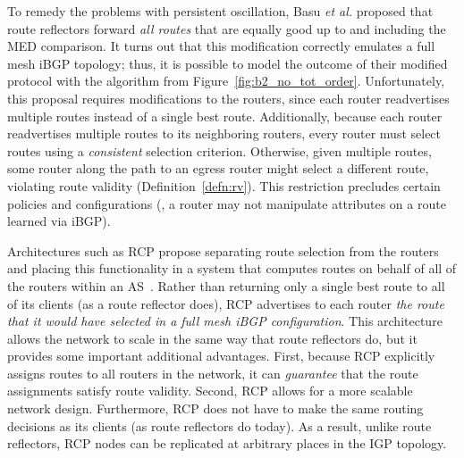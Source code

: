 To remedy the problems with persistent oscillation, Basu {\em et al.}
proposed that route reflectors forward {\em all routes} that are equally
good up to and including the MED comparison.  It turns out that this
modification correctly emulates a full mesh iBGP topology; thus, it is
possible to model the outcome of their modified protocol with the
algorithm from Figure~\ref{fig:b2_no_tot_order}.  
Unfortunately,
this proposal
requires modifications to the routers, since each router readvertises
multiple routes instead of a single best route.  Additionally, because
each router readvertises multiple routes to its neighboring routers,
every router must select routes using a {\em consistent} selection criterion.
Otherwise, given multiple routes, some router along the path to an egress
router might select a different route, violating route
validity (Definition~\ref{defn:rv}).  This 
restriction precludes certain policies and configurations (\eg, a
router may not manipulate attributes on a route learned via iBGP).


Architectures such as RCP propose separating route selection from the
routers and placing this functionality in a system that computes routes
on behalf of all of the routers within an AS~\cite{feamster:fdna2004}.
Rather than returning only a single best route to all of its clients (as
a route reflector does), RCP advertises to each router {\em the route
that it would have selected in a full mesh iBGP configuration}.  This
architecture allows the network to scale in the same way that route
reflectors do, but it provides some important additional advantages.
First, because RCP explicitly assigns routes to all routers in the
network, it can {\em guarantee} that the route assignments satisfy route
validity.  Second, RCP allows for a more 
scalable network design.  Furthermore, RCP does not have to make the
same routing decisions as its clients (as route reflectors do today).
As a result, unlike route reflectors, RCP nodes can be replicated at
arbitrary places in the IGP topology.

